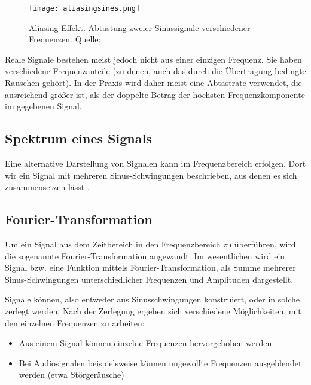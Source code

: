 \begin{figure}[ht]
	\centering
	\texttt{[image: aliasingsines.png]}
	\caption[Aliasing Effekt. Abtastung zweier Sinussignale verschiedener Frequenzen]{Aliasing Effekt. Abtastung zweier Sinussignale verschiedener Frequenzen. \newline Quelle: \cite[Moxfyre]{aliasingsampling:2009}} 
	\label{abtasttheorem}
\end{figure}

Reale Signale bestehen meist jedoch nicht aus einer einzigen Frequenz. Sie haben verschiedene Frequenzanteile (zu denen, auch das durch die Übertragung bedingte Rauschen gehört).
In der Praxis wird daher meist eine Abtastrate verwendet, die ausreichend größer ist, als der doppelte Betrag der höchsten Frequenzkomponente im gegebenen Signal.





\subsection{Spektrum eines Signals}
Eine alternative Darstellung von Signalen kann im Frequenzbereich erfolgen. Dort wir ein Signal mit mehreren Sinus-Schwingungen beschrieben, aus denen es sich zusammensetzen lässt \cite[vgl. Karrenberg, S. 42]{Karrenberg:2017}.





\subsection{Fourier-Transformation}
Um ein Signal aus dem Zeitbereich in den Frequenzbereich zu überführen, wird die sogenannte Fourier-Transformation angewandt.\newline
Im wesentlichen wird ein Signal bzw. eine Funktion mittels Fourier-Transformation, als Summe mehrerer Sinus-Schwingungen unterschiedlicher Frequenzen und Amplituden dargestellt.
\label{fft-grundlagen}

Signale können, also entweder aus Sinusschwingungen konstruiert, oder in solche zerlegt werden.
Nach der Zerlegung ergeben sich verschiedene Möglichkeiten, mit den einzelnen Frequenzen zu arbeiten:
\begin{itemize}
	\item Aus einem Signal können einzelne Frequenzen hervorgehoben werden
	\item Bei Audiosignalen beispielsweise können ungewollte Frequenzen ausgeblendet werden (etwa Störgeräusche)
\end{itemize}

